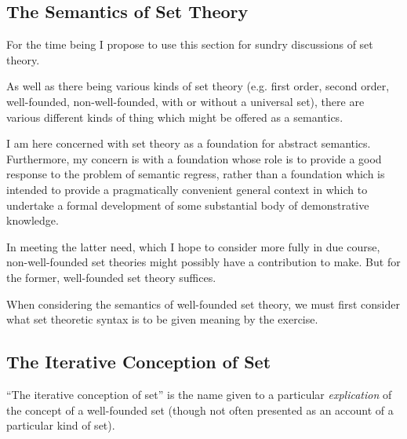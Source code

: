 \documentclass[numreferences]{rbjk}
\begin{document}
\begin{article}
\section{The Semantics of Set Theory}

For the time being I propose to use this section for sundry discussions of set theory.

As well as there being various kinds of set theory (e.g. first order, second order, well-founded, non-well-founded, with or without a universal set), there are various different kinds of thing which might be offered as a semantics.

I am here concerned with set theory as a foundation for abstract semantics.
Furthermore, my concern is with a foundation whose role is to provide a good response to the problem of semantic regress, rather than a foundation which is intended to provide a pragmatically convenient general context in which to undertake a formal development of some substantial body of demonstrative knowledge.

In meeting the latter need, which I hope to consider more fully in due course, non-well-founded set theories might possibly have a contribution to make.
But for the former, well-founded set theory suffices.

When considering the semantics of well-founded set theory, we must first consider what set theoretic syntax is to be given meaning by the exercise.




\subsection{The Iterative Conception of Set}

``The iterative conception of set'' is the name given to a particular {\it explication} of the concept of a well-founded set (though not often presented as an account of a particular kind of set).



%

%
%

\end{article}
\end{document}
